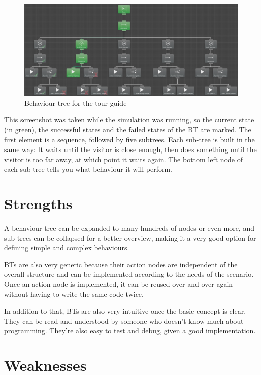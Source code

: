 \begin{figure}[H]
	\centering
		\includegraphics[scale=0.328]{images/behaviour_tree_tour_guide.png}
	\caption{Behaviour tree for the tour guide}
	\label{fig:behaviour_tree_tour_guide}
\end{figure}

This screenshot was taken while the simulation was running, so the current state (in green), the successful states and the failed states of the BT are marked. The first element is a sequence, followed by five subtrees. Each sub-tree is built in the same way: It waits until the visitor is close enough, then does something until the visitor is too far away, at which point it waits again. The bottom left node of each sub-tree tells you what behaviour it will perform.

\section{Strengths}
\label{sec:projectevolution_strengths}

A behaviour tree can be expanded to many hundreds of nodes or even more, and sub-trees can be collapsed for a better overview, making it a very good option for defining simple and complex behaviours.

BTs are also very generic because their action nodes are independent of the overall structure and can be implemented according to the needs of the scenario. Once an action node is implemented, it can be reused over and over again without having to write the same code twice.

In addition to that, BTs are also very intuitive once the basic concept is clear. They can be read and understood by someone who doesn't know much about programming. They're also easy to test and debug, given a good implementation.

\section{Weaknesses}
\label{sec:projectevolution_weaknesses}

